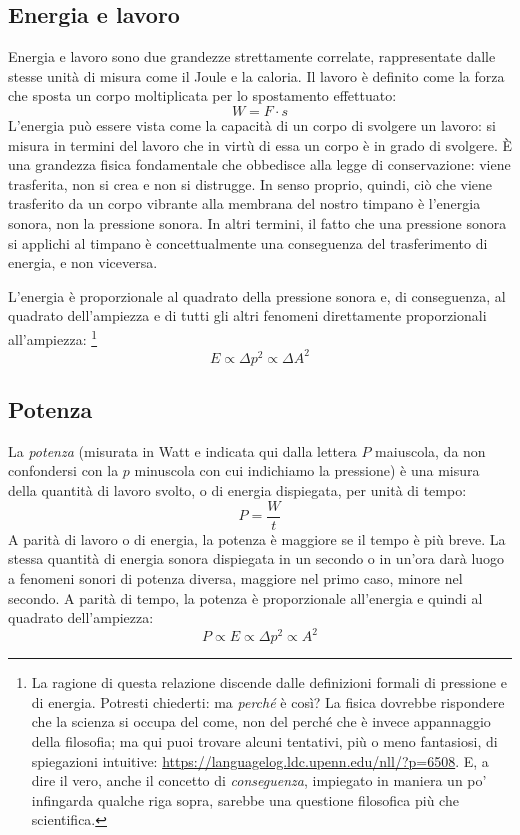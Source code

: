 \documentclass[11pt]{report}
\begin{document}
\subsection{Energia e lavoro}
Energia e lavoro sono due grandezze strettamente correlate, rappresentate dalle stesse unità di misura come il Joule e la caloria. Il lavoro è definito come la forza che sposta un corpo moltiplicata per lo spostamento effettuato:
\begin{equation}
W = F \cdot s
\end{equation}
L'energia può essere vista come la capacità di un corpo di svolgere un lavoro: si misura in termini del lavoro che in virtù di essa un corpo è in grado di svolgere. È una grandezza fisica fondamentale che obbedisce alla legge di conservazione: viene trasferita, non si crea e non si distrugge. In senso proprio, quindi, ciò che viene trasferito da un corpo vibrante alla membrana del nostro timpano è l'energia sonora, non la pressione sonora. In altri termini, il fatto che una pressione sonora si applichi al timpano è concettualmente una conseguenza del trasferimento di energia, e non viceversa.

L'energia è proporzionale al quadrato della pressione sonora e, di conseguenza, al quadrato dell'ampiezza e di tutti gli altri fenomeni direttamente proporzionali all'ampiezza:%
\footnote{La ragione di questa relazione discende dalle definizioni formali di pressione e di energia. Potresti chiederti: ma \emph{perché} è così? La fisica dovrebbe rispondere che la scienza si occupa del come, non del perché che è invece appannaggio della filosofia; ma qui puoi trovare alcuni tentativi, più o meno fantasiosi, di spiegazioni intuitive: \url{https://languagelog.ldc.upenn.edu/nll/?p=6508}. E, a dire il vero, anche il concetto di \emph{conseguenza}, impiegato in maniera un po' infingarda qualche riga sopra, sarebbe una questione filosofica più che scientifica.}
\begin{equation}
E \propto \Delta p^2 \propto \Delta A^2
\end{equation}



\subsection{Potenza}

La \emph{potenza} (misurata in Watt e indicata qui dalla lettera $P$ maiuscola, da non confondersi con la $p$ minuscola con cui indichiamo la pressione) è una misura della quantità di lavoro svolto, o di energia dispiegata, per unità di tempo: 
\begin{equation}
P = \frac{W}{t}
\end{equation}
A parità di lavoro o di energia, la potenza è maggiore se il tempo è più breve. La stessa quantità di energia sonora dispiegata in un secondo o in un'ora darà luogo a fenomeni sonori di potenza diversa, maggiore nel primo caso, minore nel secondo. A parità di tempo, la potenza è proporzionale all'energia e quindi al quadrato dell'ampiezza:
\begin{equation}
P \propto E \propto \Delta p^2 \propto A^2
\end{equation}
\end{document}
